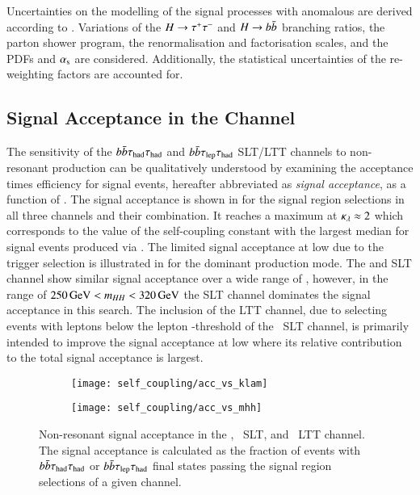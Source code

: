 Uncertainties on the modelling of the signal processes with anomalous
\klambda are derived according to .
Variations of the $H \to \tau^{+} \tau^{-}$ and $H \to b\bar{b}$ branching ratios,
the parton shower program, the renormalisation and factorisation
scales, and the PDFs and $\alpha_{\text{s}}$ are considered. Additionally, the
statistical uncertainties of the \klambda re-weighting factors are
accounted for.


\subsection{Signal Acceptance in the \bbtautau Channel}%
\label{sec:self_coupling_bbtt_limitations}

The sensitivity of the $b\bar{b}\tau_{\text{had}}\tau_{\text{had}}$ and $b\bar{b}\tau_{\text{lep}}\tau_{\text{had}}$ SLT/LTT
channels to non-resonant \HH production can be qualitatively
understood by examining the acceptance times efficiency for signal
events, hereafter abbreviated as \emph{signal acceptance}, as a
function of \klambda. The signal acceptance is shown in
 for the signal region selections in
all three channels and their combination. It reaches a maximum at
$\kappa_{\lambda} \approx 2$ which corresponds to the value of the
self-coupling constant with the largest median \mHH for signal events
produced via \ggF. The limited signal acceptance at low \mHH due to
the trigger selection is illustrated in 
for the dominant \ggF production mode. The \hadhad and \lephad SLT
channel show similar signal acceptance over a wide range of \mHH,
however, in the range of $\SI{250}{\ensuremath{\text{GeV}}}< m_{HH} < \SI{320}{\ensuremath{\text{GeV}}}$ the
\lephad SLT channel dominates the signal acceptance in this
search. The inclusion of the \lephad LTT channel, due to selecting
events with leptons below the lepton \pT-threshold of the \lephad~SLT
channel, is primarily intended to improve the signal acceptance at low
\mHH where its relative contribution to the total signal acceptance is
largest.

\begin{figure}[htbp]
  \centering

  \begin{subfigure}[t]{0.485\textwidth}
    \texttt{[image: self\_coupling/acc\_vs\_klam]}
    \label{fig:acceptance_vs_klambda}
  \end{subfigure}\hfill%
  \begin{subfigure}[t]{0.485\textwidth}
    \texttt{[image: self\_coupling/acc\_vs\_mhh]}
    \label{fig:acceptance_vs_mhh}
  \end{subfigure}

  \caption{Non-resonant \HH signal acceptance in the \hadhad,
    \lephad~SLT, and \lephad~LTT channel. The signal acceptance is
    calculated as the fraction of events with $b\bar{b}\tau_{\text{had}}\tau_{\text{had}}$
    or $b\bar{b}\tau_{\text{lep}}\tau_{\text{had}}$ final states passing the signal region
    selections of a given channel.}%
  \label{fig:acceptance_vs_klambda_vs_mhh}
\end{figure}

